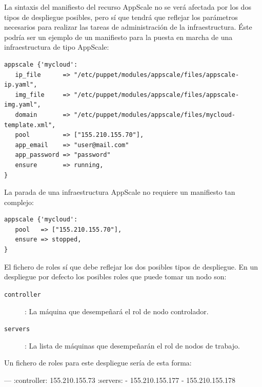 
La sintaxis del manifiesto del recurso AppScale no se verá afectada por los dos tipos de despliegue posibles, pero sí que tendrá que reflejar los parámetros necesarios para realizar las tareas de administración de la infraestructura. Éste podría ser un ejemplo de un manifiesto para la puesta en marcha de una infraestructura de tipo AppScale:

\begin{lstlisting}
appscale {'mycloud':
   ip_file      => "/etc/puppet/modules/appscale/files/appscale-ip.yaml",
   img_file     => "/etc/puppet/modules/appscale/files/appscale-img.yaml",
   domain       => "/etc/puppet/modules/appscale/files/mycloud-template.xml",
   pool         => ["155.210.155.70"],
   app_email    => "user@mail.com"
   app_password => "password"
   ensure       => running,
}
\end{lstlisting}

La parada de una infraestructura AppScale no requiere un manifiesto tan complejo:

\begin{lstlisting}
appscale {'mycloud':
   pool   => ["155.210.155.70"],
   ensure => stopped,
}
\end{lstlisting}


El fichero de roles sí que debe reflejar los dos posibles tipos de despliegue. En un despliegue por defecto los posibles roles que puede tomar un nodo son:

\begin{description}
\item[\texttt{controller}]: La máquina que desempeñará el rol de nodo controlador.
\item[\texttt{servers}]: La lista de máquinas que desempeñarán el rol de nodos de trabajo.
\end{description}

Un fichero de roles para este despliegue sería de esta forma:

\begin{yamlcode}
--- 
:controller: 155.210.155.73
:servers: 
- 155.210.155.177
- 155.210.155.178
\end{yamlcode}

